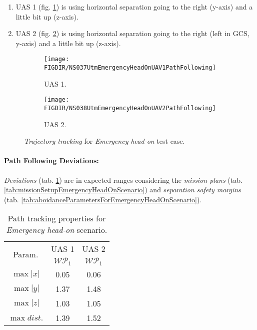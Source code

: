 \begin{enumerate}
    \item UAS 1 (fig. \ref{fig:emergencyHeadOnUAS1PathTracking}) is using horizontal separation going to the right (y-axis) and a little bit up (z-axis).
    
    \item UAS 2 (fig. \ref{fig:emergencyHeadOnUAS2PathTracking}) is using horizontal separation going to the right (left in GCS, y-axis) and a little bit up (z-axis).
\end{enumerate}

\begin{figure}[H]
	\centering
    \begin{subfigure}{0.48\textwidth}
    	\centering
        \texttt{[image: \\FIGDIR/NS037UtmEmergencyHeadOnUAV1PathFollowing]}
        \caption{UAS 1.}
        \label{fig:emergencyHeadOnUAS1PathTracking}
    \end{subfigure}
    \begin{subfigure}{0.48\textwidth}
    	\centering
        \texttt{[image: \\FIGDIR/NS038UtmEmergencyHeadOnUAV2PathFollowing]} 
        \caption{UAS 2.}
        \label{fig:emergencyHeadOnUAS2PathTracking}
    \end{subfigure}
    \caption{\emph{Trajectory tracking} for \emph{Emergency head-on} test case. }
    \label{fig:emergencyHeadOnTrajectoryTrackingPerformance}
\end{figure}


\paragraph{Path Following Deviations:} \emph{Deviations} (tab. \ref{tab:pathTrackingParametersForEmergencyHeadOn}) are in expected ranges considering the \emph{mission plans} (tab. \ref{tab:missionSetupEmergencyHeadOnScenario}) and \emph{separation safety margins} (tab. \ref{tab:aboidanceParametersForEmergencyHeadOnScenario}).


\begin{table}[H]
    \centering
    \begin{tabular}{c||c|c}
        \multirow{2}{*}{Param.} & UAS 1     & UAS 2\\\cline{2-3}
                        & $\mathscr{WP}_1$  & $\mathscr{WP}_1$\\\hline\hline
          $\max |x|$    & 0.05              & 0.06 \\\hline
          $\max |y|$    & 1.37              & 1.48 \\\hline
          $\max |z|$    & 1.03              & 1.05 \\\hline
          $\max dist.$  & 1.39              & 1.52 \\
    \end{tabular}
    \caption{Path tracking properties for \emph{Emergency head-on} scenario.}
    \label{tab:pathTrackingParametersForEmergencyHeadOn}
\end{table}

